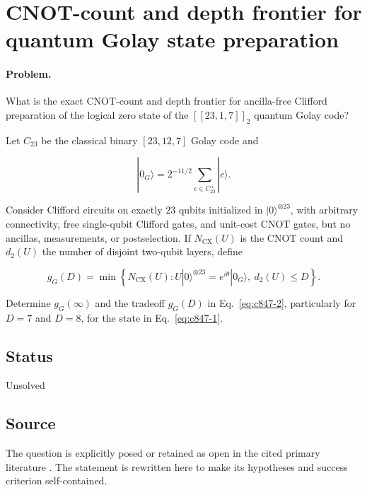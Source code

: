 \section{CNOT-count and depth frontier for quantum Golay state preparation}
\label{sec:op_c847b635f53b0812}

\paragraph{Problem.}
What is the exact CNOT-count and depth frontier for ancilla-free Clifford preparation of the logical zero state of the $[[23,1,7]]_2$ quantum Golay code?

Let $C_{23}$ be the classical binary $[23,12,7]$ Golay code and

\begin{equation}
|0_G\rangle=2^{-11/2}\sum_{c\in C_{23}^{\perp}}|c\rangle.
\label{eq:c847-1}
\end{equation}

Consider Clifford circuits on exactly $23$ qubits initialized in $|0\rangle^{\otimes23}$, with arbitrary connectivity, free single-qubit Clifford gates, and unit-cost CNOT gates, but no ancillas, measurements, or postselection. If $N_{\mathrm{CX}}(U)$ is the CNOT count and $d_2(U)$ the number of disjoint two-qubit layers, define

\begin{equation}
g_G(D)=\min\left\{N_{\mathrm{CX}}(U):
U|0\rangle^{\otimes23}=e^{i\theta}|0_G\rangle,\ d_2(U)\leq D\right\}.
\label{eq:c847-2}
\end{equation}

Determine $g_G(\infty)$ and the tradeoff $g_G(D)$ in Eq.~\eqref{eq:c847-2}, particularly for $D=7$ and $D=8$, for the state in Eq.~\eqref{eq:c847-1}.

\subsection*{Status}

Unsolved

\subsection*{Source}

The question is explicitly posed or retained as open in the cited primary literature .  The statement is rewritten here to make its hypotheses and success criterion self-contained.

